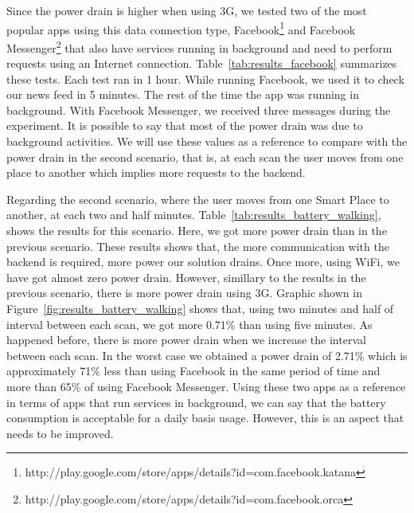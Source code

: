 Since the power drain is higher when using \gls{3G}, we tested two of the most popular apps using this data connection type, Facebook\footnote{http://play.google.com/store/apps/details?id=com.facebook.katana} and Facebook Messenger\footnote{http://play.google.com/store/apps/details?id=com.facebook.orca} that also have services running in background and need to perform requests using an Internet connection.
Table~\ref{tab:results_facebook} summarizes these tests.
Each test ran in 1 hour.
While running Facebook, we used it to check our news feed in 5 minutes. The rest of the time the app was running in background.
With Facebook Messenger, we received three messages during the experiment.
It is possible to say that most of the power drain was due to background activities.
We will use these values as a reference to compare with the power drain in the second scenario, that is, at each scan the user moves from one place to another which implies more requests to the backend.



Regarding the second scenario, where the user moves from one Smart Place to another, at each two and half minutes.
Table~\ref{tab:results_battery_walking}, shows the results for this scenario. Here, we got more power drain than in the previous scenario.
These results shows that, the more communication with the backend is required, more power our solution drains.
Once more, using \gls{WiFi}, we have got almost zero power drain.
However, simillary to the results in the previous scenario, there is more power drain using \gls{3G}.
Graphic shown in Figure~\ref{fig:results_battery_walking} shows that, using two minutes and half of interval between each scan, we got more 0.71\% than using five minutes.
As happened before, there is more power drain when we increase the interval between each scan.
In the worst case we obtained a power drain of 2.71\% which is approximately 71\% less than using Facebook in the same period of time and more than 65\% of using Facebook Messenger.
Using these two apps as a reference in terms of apps that run services in background, we can say that the battery consumption is acceptable for a daily basis usage.
However, this is an aspect that needs to be improved.



